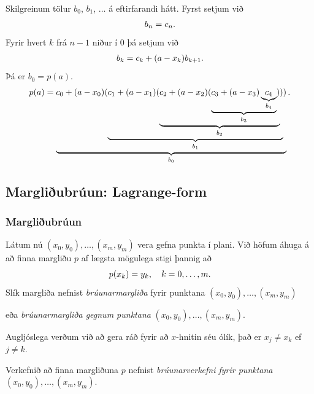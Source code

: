 \documentclass[a4paper,10pt,icelandic]{sphinxmanual}
\begin{document}
Skilgreinum tölur \(b_0\), \(b_1\), \(\ldots\) á
eftirfarandi hátt. Fyrst setjum við
\begin{gather}
\begin{split}b_n = c_n.\end{split}\notag
\end{gather}
Fyrir hvert \(k\) frá \(n-1\) niður í 0 þá setjum við
\begin{gather}
\begin{split}b_k = c_k + (a - x_k) b_{k+1}.\end{split}\notag
\end{gather}
Þá er \(b_0 = p(a)\).
\begin{gather}
\begin{split}p(a) =
    \underbrace{
      c_0 + (a-x_0)(
      \underbrace{
        c_1 + (a-x_1)(
          \underbrace{c_2 + (a-x_2)(
        \underbrace{c_3 + (a-x_3)
          \underbrace{c_4}_{b_4}
          }_{b_3})
        }_{b_2})
      }_{b_1})
    }_{b_0}.\end{split}\notag
\end{gather}

\subsection{Margliðubrúun: Lagrange-form}
\label{kafli03:margliubruun-lagrange-form}\label{kafli03:index-6}

\subsubsection{Margliðubrúun}
\label{kafli03:margliubruun}
Látum nú \((x_0,y_0), \ldots, (x_m,y_m)\) vera gefna punkta í plani.
Við höfum áhuga á að finna margliðu \(p\) af lægsta mögulega stigi
þannig að
\begin{gather}
\begin{split}p(x_k) = y_k, \quad k = 0, \ldots, m.\end{split}\notag
\end{gather}
Slík margliða nefnist \emph{brúunarmargliða} fyrir punktana
\((x_0,y_0), \ldots, (x_m,y_m)\)

eða \emph{brúunarmargliða gegnum punktana}
\((x_0,y_0), \ldots, (x_m,y_m)\).

Augljóslega verðum við að gera ráð fyrir að \(x\)-hnitin séu ólík,
það er \(x_j \not= x_k\) ef \(j \not= k\).

Verkefnið að finna margliðuna \(p\) nefnist \emph{brúunarverkefni fyrir
punktana} \((x_0,y_0), \ldots, (x_m,y_m)\).
\end{document}
